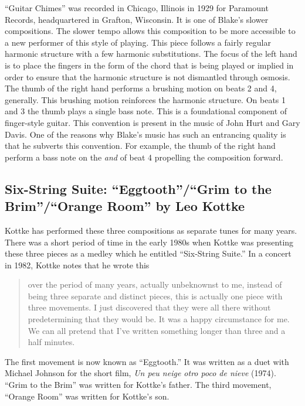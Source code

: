 \documentclass{tufte-handout}
\begin{document}
``Guitar Chimes'' was recorded in Chicago, Illinois in 1929 for
Paramount Records, headquartered in Grafton, Wisconsin. It is one of
Blake's slower compositions. The slower tempo allows this composition
to be more accessible to a new performer of this style of
playing. This piece follows a fairly regular harmonic structure with a
few harmonic substitutions. The focus of the left hand is to place the
fingers in the form of the chord that is being played or implied in
order to ensure that the harmonic structure is not dismantled through
osmosis. The thumb of the right hand performs a brushing motion on
beats 2 and 4, generally. This brushing motion reinforces the harmonic
structure. On beats 1 and 3 the thumb plays a single bass note. This
is a foundational component of finger-style guitar. This convention is
present in the music of John Hurt and Gary Davis. One of the reasons
why Blake's music has such an entrancing quality is that he subverts
this convention. For example, the thumb of the right hand perform a
bass note on the \emph{and} of beat 4 propelling the composition
forward.
\subsection*{Six-String Suite: ``Eggtooth''/``Grim to the Brim''/``Orange
  Room'' by Leo Kottke}
Kottke has performed these three compositions as separate tunes for
many years. There was a short period of time in the early 1980s when
Kottke was presenting these three pieces as a medley which he entitled
``Six-String Suite.''  In a concert in 1982, Kottke notes that he
wrote this
\begin{quote}
  over the period of many years, actually unbeknownst to me, instead of being
  three separate and distinct pieces, this is actually one piece with three
  movements. I just discovered that they were all there without predetermining
  that they would be. It was a happy circumstance for me. We can all pretend
  that I've written something longer than three and a half minutes.
\end{quote}
The first movement is now known as ``Eggtooth.'' It was written as a
duet with Michael Johnson for the short film, \emph{Un peu neige otro
  poco de nieve} (1974). ``Grim to the Brim'' was written for Kottke's
father. The third movement, ``Orange Room'' was written for Kottke's
son.
\end{document}
